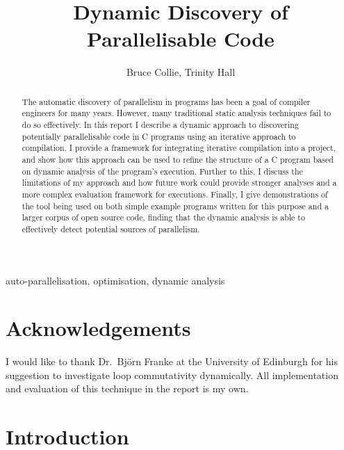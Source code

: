 \documentclass[journal]{IEEEtran}
\begin{document}
\lstset{language=C}
\lstset{
  basicstyle=\footnotesize\ttfamily,
  showstringspaces=false
}

\title{Dynamic Discovery of Parallelisable Code}
\author{Bruce Collie, Trinity Hall}


\maketitle

\begin{abstract}

  The automatic discovery of parallelism in programs has been a goal of compiler
  engineers for many years. However, many traditional static analysis techniques
  fail to do so effectively. In this report I describe a dynamic approach to
  discovering potentially parallelisable code in C programs using an iterative
  approach to compilation. I provide a framework for integrating iterative
  compilation into a project, and show how this approach can be used to refine
  the structure of a C program based on dynamic analysis of the program's
  execution. Further to this, I discuss the limitations of my approach and how
  future work could provide stronger analyses and a more complex evaluation
  framework for executions. Finally, I give demonstrations of the tool being
  used on both simple example programs written for this purpose and a larger
  corpus of open source code, finding that the dynamic analysis is able to
  effectively detect potential sources of parallelism.

\end{abstract}

\begin{IEEEkeywords}
auto-parallelisation, optimisation, dynamic analysis
\end{IEEEkeywords}

\IEEEpeerreviewmaketitle

\section*{Acknowledgements}

I would like to thank Dr.\ Bj\"orn Franke at the University of Edinburgh for
his suggestion to investigate loop commutativity dynamically. All implementation
and evaluation of this technique in the report is my own.

\section{Introduction} \label{sec:intro}
\end{document}
